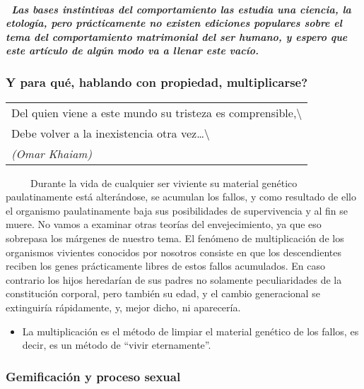 \subparagraph{~Las bases instintivas del comportamiento las estudia una
ciencia, la etología, pero prácticamente no existen ediciones populares
sobre el tema del comportamiento matrimonial del ser humano, y espero
que este artículo de algún modo va a llenar este
vacío.}\label{las-bases-instintivas-del-comportamiento-las-estudia-una-ciencia-la-etologuxeda-pero-pruxe1cticamente-no-existen-ediciones-populares-sobre-el-tema-del-comportamiento-matrimonial-del-ser-humano-y-espero-que-este-artuxedculo-de-alguxfan-modo-va-a-llenar-este-vacuxedo.}

\protect\hypertarget{M1A}{}{}

\subsubsection{Y para qué, hablando con propiedad,
multiplicarse?}\label{y-para-quuxe9-hablando-con-propiedad-multiplicarse}

\begin{longtable}[]{@{}l@{}}
\toprule
Del quien viene a este mundo su tristeza es
comprensible,\textbackslash{}\tabularnewline
Debe volver a la inexistencia otra
vez\ldots{}\textbackslash{}\tabularnewline
\emph{(Omar Khaiam)}\tabularnewline
\bottomrule
\end{longtable}

~ ~ ~ Durante la vida de cualquier ser viviente su material genético
paulatinamente está alterándose, se acumulan los fallos, y como
resultado de ello el organismo paulatinamente baja sus posibilidades de
supervivencia y al fin se muere. No vamos a examinar otras teorías del
envejecimiento, ya que eso sobrepasa los márgenes de nuestro tema. El
fenómeno de multiplicación de los organismos vivientes conocidos por
nosotros consiste en que los descendientes reciben los genes
prácticamente libres de estos fallos acumulados. En caso contrario los
hijos heredarían de sus padres no solamente peculiaridades de la
constitución corporal, pero también su edad, y el cambio generacional se
extinguiría rápidamente, y, mejor dicho, ni aparecería.

\begin{itemize}
\tightlist
\item
  La multiplicación es el método de limpiar el material genético de los
  fallos, es decir, es un método de ``vivir eternamente''.
\end{itemize}

\protect\hypertarget{M2}{}{}

\subsubsection{Gemificación y proceso
sexual}\label{gemificaciuxf3n-y-proceso-sexual}

